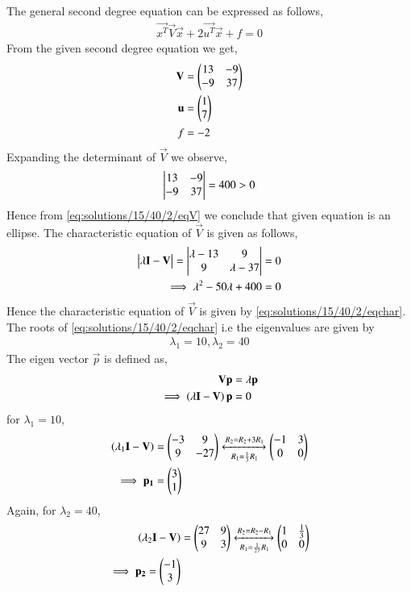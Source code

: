 The general second degree equation can be expressed as follows,
\begin{align}
\vec{x^T}\vec{V}\vec{x}+2\vec{u^T}\vec{x}+f=0\label{eq:solutions/15/40/2/eqmain}
\end{align}
From the given second degree equation we get,
\begin{align}
\mathbf{V} &= \begin{pmatrix}13&-9\\-9&37\end{pmatrix}\\
\mathbf{u} &= \begin{pmatrix}1\\7\end{pmatrix}\\
f &= -2
\end{align}
Expanding the determinant of $\vec{V}$ we observe, 
\begin{align}
\begin{vmatrix}13&-9\\-9&37\end{vmatrix} = 400>0 \label{eq:solutions/15/40/2/eqV}
\end{align}
Hence from \eqref{eq:solutions/15/40/2/eqV} we conclude that given equation is an ellipse. The characteristic equation of $\vec{V}$ is given as follows,
\begin{align}
\begin{vmatrix}\lambda\mathbf{I}-\mathbf{V}\end{vmatrix} = \begin{vmatrix}\lambda-13&9\\9&\lambda-37\end{vmatrix} &= 0\\
\implies \lambda^2-50\lambda+400 &= 0\label{eq:solutions/15/40/2/eqchar}
\end{align}
Hence the characteristic equation of $\vec{V}$ is given by \eqref{eq:solutions/15/40/2/eqchar}. The roots of \eqref{eq:solutions/15/40/2/eqchar} i.e the eigenvalues are given by
\begin{align}
\lambda_1=10, \lambda_2=40\label{eq:solutions/15/40/2/eqeigenvals}    
\end{align}
The eigen vector $\vec{p}$ is defined as, 
\begin{align}
\mathbf{V}\mathbf{p} &= \lambda\mathbf{p}\\
\implies\left(\lambda\mathbf{I}-\mathbf{V}\right)\mathbf{p}&=0
\end{align}
for $\lambda_1=10$,
\begin{align}
\left(\lambda_1\mathbf{I}-\mathbf{V}\right)&=\begin{pmatrix}-3&9\\9&-27\end{pmatrix}\xleftrightarrow[R_1=\frac{1}{3}R_1]{R_2=R_2+3R_1}\begin{pmatrix}-1&3\\0&0\end{pmatrix}\\
\implies\mathbf{p_1}&=\begin{pmatrix}3\\1\end{pmatrix}
\end{align}
Again, for $\lambda_2=40$,
\begin{align}
\left(\lambda_2\mathbf{I}-\mathbf{V}\right)&=\begin{pmatrix}27&9\\9&3\end{pmatrix}\xleftrightarrow[R_1=\frac{1}{27}R_1]{R_2=R_2-R_1}\begin{pmatrix}1&\frac{1}{3}\\0&0\end{pmatrix}\\
\implies\mathbf{p_2}=\begin{pmatrix}-1\\3\end{pmatrix}
\end{align}
